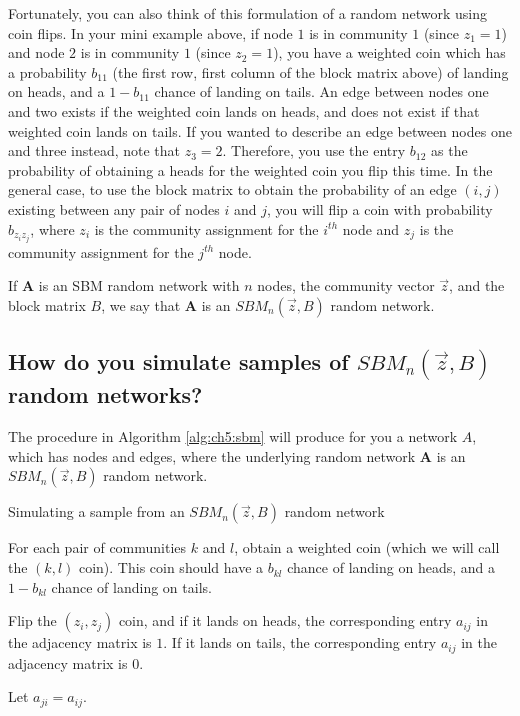 Fortunately, you can also think of this formulation of a random network using coin flips. In your mini example above, if node $1$ is in community $1$ (since $z_1 = 1$) and node $2$ is in community $1$ (since $z_2 = 1$), you have a weighted coin which has a probability $b_{11}$ (the first row, first column of the block matrix above) of landing on heads, and a $1 - b_{11}$ chance of landing on tails. An edge between nodes one and two exists if the weighted coin lands on heads, and does not exist if that weighted coin lands on tails. If you wanted to describe an edge between nodes one and three instead, note that $z_3 = 2$. Therefore, you use the entry $b_{12}$ as the probability of obtaining a heads for the weighted coin you flip this time. In the general case, to use the block matrix to obtain the probability of an edge $(i, j)$ existing between any pair of nodes $i$ and $j$, you will flip a coin with probability $b_{z_i z_j}$, where $z_i$ is the community assignment for the $i^{th}$ node and $z_j$ is the community assignment for the $j^{th}$ node.

If $\mathbf A$ is an SBM random network with $n$ nodes, the community vector $\vec z$, and the block matrix $B$, we say that $\mathbf A$ is an $SBM_n(\vec z, B)$ random network.

\subsection{How do you simulate samples of $SBM_n(\vec z, B)$ random networks?}

The procedure in Algorithm \ref{alg:ch5:sbm} will produce for you a network $A$, which has nodes and edges, where the underlying random network $\mathbf A$ is an $SBM_n(\vec z, B)$ random network.

\begin{algorithm}[h]\caption{Simulating a sample from an $SBM_n(\vec z, B)$ random network}
\label{alg:ch5:sbm}
\SetAlgoLined
{}

For each pair of communities $k$ and $l$, obtain a weighted coin (which we will call the $(k,l)$ coin). This coin should have a $b_{kl}$ chance of landing on heads, and a $1 - b_{kl}$ chance of landing on tails.

 {
     {
        Flip the $(z_i, z_j)$ coin, and if it lands on heads, the corresponding entry $a_{ij}$ in the adjacency matrix is $1$. If it lands on tails, the corresponding entry $a_{ij}$ in the adjacency matrix is $0$.

        Let $a_{ji} = a_{ij}$.
    }
}

\end{algorithm}


